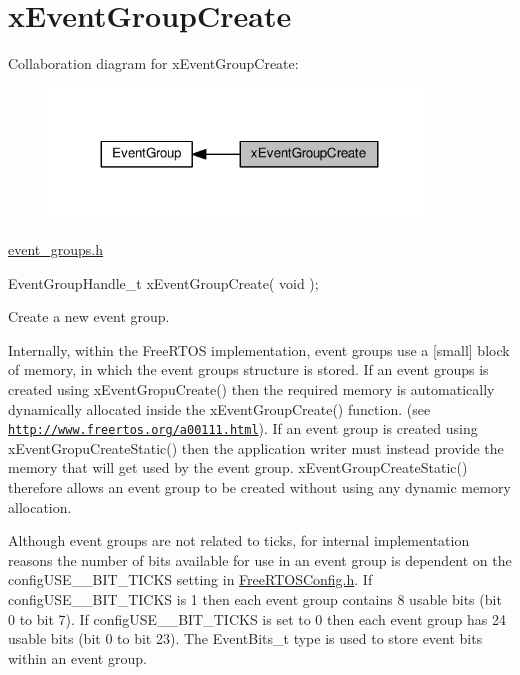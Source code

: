 \hypertarget{group__xEventGroupCreate}{}\section{x\+Event\+Group\+Create}
\label{group__xEventGroupCreate}
Collaboration diagram for x\+Event\+Group\+Create\+:\nopagebreak
\begin{figure}[H]
\begin{center}
\leavevmode
\includegraphics[width=287pt]{df/d78/group__xEventGroupCreate}
\end{center}
\end{figure}
\hyperlink{event__groups_8h}{event\+\_\+groups.\+h} 
\begin{DoxyPre}
EventGroupHandle\_t xEventGroupCreate( void );
\end{DoxyPre}


Create a new event group.

Internally, within the Free\+R\+T\+OS implementation, event groups use a \mbox{[}small\mbox{]} block of memory, in which the event group\textquotesingle{}s structure is stored. If an event groups is created using x\+Event\+Gropu\+Create() then the required memory is automatically dynamically allocated inside the x\+Event\+Group\+Create() function. (see \href{http://www.freertos.org/a00111.html}{\tt http\+://www.\+freertos.\+org/a00111.\+html}). If an event group is created using x\+Event\+Gropu\+Create\+Static() then the application writer must instead provide the memory that will get used by the event group. x\+Event\+Group\+Create\+Static() therefore allows an event group to be created without using any dynamic memory allocation.

Although event groups are not related to ticks, for internal implementation reasons the number of bits available for use in an event group is dependent on the config\+U\+S\+E\+\_\+\_\+\+B\+I\+T\+\_\+\+T\+I\+C\+KS setting in \hyperlink{FreeRTOSConfig_8h}{Free\+R\+T\+O\+S\+Config.\+h}. If config\+U\+S\+E\+\_\+\_\+\+B\+I\+T\+\_\+\+T\+I\+C\+KS is 1 then each event group contains 8 usable bits (bit 0 to bit 7). If config\+U\+S\+E\+\_\+\_\+\+B\+I\+T\+\_\+\+T\+I\+C\+KS is set to 0 then each event group has 24 usable bits (bit 0 to bit 23). The Event\+Bits\+\_\+t type is used to store event bits within an event group.

